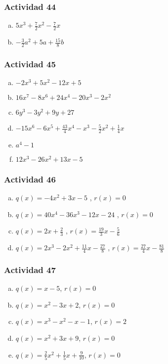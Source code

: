 \documentclass[a4paper, twocolumn]{article}
\begin{document}
\pagebreak
\subsubsection*{Actividad 44}
\begin{enumerate}[a)]
\item $5x^3 + \frac{7}{2}x^2 - \frac{7}{2}x$
\item $-\frac{3}{2}a^2 + 5a + \frac{15}{8}b$
\end{enumerate}

\subsubsection*{Actividad 45}
\begin{enumerate}[a)]
\item $-2x^3 + 5x^2 - 12x +5$
\item $16x^7 - 8x^6 +24x^4 - 20x^3 -2x^2$
\item $6y^3 - 3y^2 + 9y + 27$
\item $-15x^6 -6x^5 + \frac{43}{4}x^4-x^3-\frac{5}{2}x^2 + \frac{1}{4}x$
\item $a^4 - 1$
\item $12x^3 -26x^2 + 13x -5$
\end{enumerate}

\subsubsection*{Actividad 46}
\begin{enumerate}[a)]
\item $q(x) = -4x^2 + 3x -5$ , $r(x)=0$
\item $q(x) = 40x^4 -36x^3 -12x -24$ , $r(x)=0$
\item $q(x) = 2x+\frac{2}{3}$ , $r(x)=\frac{19}{3}x - \frac{5}{6}$
\item $q(x) = 2x^3 -2x^2 +\frac{11}{4}x-\frac{27}{8}$ , $r(x) = \frac{27}{4}x -\frac{81}{8}$
\end{enumerate}

\subsubsection*{Actividad 47}
\begin{enumerate}[a)]
\item $q(x) = x - 5$, $r(x) = 0 $
\item $q(x) = x^2 -3x +2$, $r(x) = 0$
\item $q(x) = x^3 - x^2 - x -1$, $r(x)=2$
\item $q(x) = x^2 + 3x + 9$, $r(x)=0$
\item $q(x) = \frac{2}{5}x^2+\frac{1}{5}x+\frac{9}{10}$, $r(x)=0$

\end{enumerate}
\end{document}
